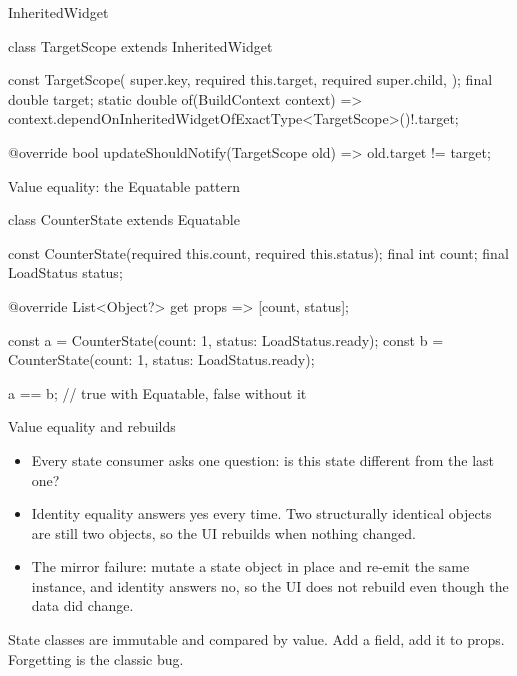 \documentclass[10pt,aspectratio=169,t]{beamer}
\begin{document}
\begin{frame}[fragile,eyebrow=Sharing state]{InheritedWidget}
\begin{dart}
class TargetScope extends InheritedWidget {
  const TargetScope({
    super.key,
    required this.target,
    required super.child,
  });
  final double target;
  static double of(BuildContext context) =>
      context.dependOnInheritedWidgetOfExactType<TargetScope>()!.target;

  @override
  bool updateShouldNotify(TargetScope old) => old.target != target;
}
\end{dart}
\end{frame}

\begin{frame}[fragile,eyebrow=Sharing state]{Value equality: the Equatable pattern}
\begin{dart}
class CounterState extends Equatable {
  const CounterState({required this.count, required this.status});
  final int count;
  final LoadStatus status;

  @override
  List<Object?> get props => [count, status];
}

const a = CounterState(count: 1, status: LoadStatus.ready);
const b = CounterState(count: 1, status: LoadStatus.ready);

a == b;   // true with Equatable, false without it
\end{dart}
\end{frame}

\begin{frame}[eyebrow=Sharing state]{Value equality and rebuilds}
  \vskip 3mm
  \begin{itemize}
    \item Every state consumer asks one question: is this state different from the last one?
    \item Identity equality answers yes every time. Two structurally identical objects are still two objects, so the UI rebuilds when nothing changed.
    \item The mirror failure: mutate a state object in place and re-emit the same instance, and identity answers no, so the UI does not rebuild even though the data did change.
  \end{itemize}
  \vskip 3mm
  \begin{takeaway}{State classes are immutable and compared by value.}
    Add a field, add it to props. Forgetting is the classic bug.
  \end{takeaway}
\end{frame}
\end{document}

